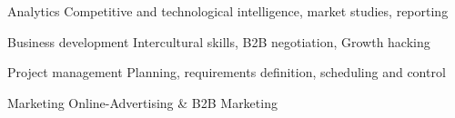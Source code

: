 

\begin{cvskills}
\cvskill
	{Analytics} %
	{Competitive and technological intelligence, market studies, reporting} %

  \cvskill
	{Business development} %
	{Intercultural skills, B2B negotiation, Growth hacking} %
	
  \cvskill
	{Project management} %
	{Planning, requirements definition, scheduling and control} %

  \cvskill
	{Marketing} %
	{Online-Advertising \& B2B Marketing} %
\end{cvskills}
